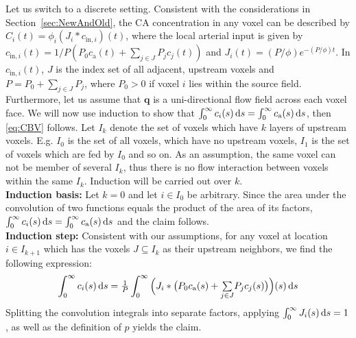 \documentclass[journal,twocolumn]{IEEEtran}
\newcommand{\ca}{c_\mathrm{a}}
\newcommand{\vq}{\mathbf{q}}
\begin{document}
	Let us switch to a discrete setting.
	Consistent with the considerations in Section~\ref{sec:NewAndOld}, the CA concentration in any voxel can be described by $C_i(t) = \phi_i(J_i\ast c_{\mathrm{in},i})(t)$, where the local arterial input is given by
		$c_{\mathrm{in},i}(t) =1/P(P_0 \ca(t) + \sum_{j \in J} P_jc_j(t))$ and $J_i(t)=(P/\phi)e^{- (P/\phi)t}$.
	In $c_{\mathrm{in},i}(t)$, $J$ is the index set of all adjacent, upstream voxels and $P=P_0 + \sum_{j\in J} P_j$, where $P_0>0$ if voxel $i$ lies within the source field.
	Furthermore, let us assume that $\vq$ is a uni-directional flow field across each voxel face.
		We will now use induction to show that $\int_0^\infty c_i(s) \diffint s = \int_0^\infty \ca(s) \diffint s$, then \eqref{eq:CBV} follows.
		Let $I_k$ denote the set of voxels which have $k$ layers of upstream voxels.
		E.g. $I_0$ is the set of all voxels, which have no upstream voxels, $I_1$ is the set of voxels which are fed by $I_0$ and so on. As an assumption, the same voxel can not be member of several $I_k$, thus there is no flow interaction between voxels within the same $I_k$.
		Induction will be carried out over $k$.\\
		\textbf{Induction basis:}
		Let $k=0$ and let $i \in I_0$ be arbitrary.
		Since the area under the convolution of two functions equals the product of the area of its factors, $\int_0^\infty c_i(s) \diffint s = \int_0^\infty \ca(s) \diffint s$ and the claim follows.\\
		\textbf{Induction step:}
		Consistent with our assumptions, for any voxel at location $i \in I_{k+1}$ which has the voxels $J \subseteq I_{k}$ as their upstream neighbors, we find the following expression:
		\begin{equation}
			\int_0^\infty c_i(s) \diffint s = \tfrac{1}{P}\int_0^\infty \Big(J_i\ast \big( P_0 \ca(s) + {\textstyle\sum\limits_{j \in J}}P_j c_j(s) \big)\Big)(s) \diffint s
		\end{equation}
		 Splitting the convolution integrals into separate factors, applying $\int_0^{\infty}J_i(s)\,\mathrm{d} s = 1$, as well as the definition of $p$ yields the claim.
	
\end{document}
